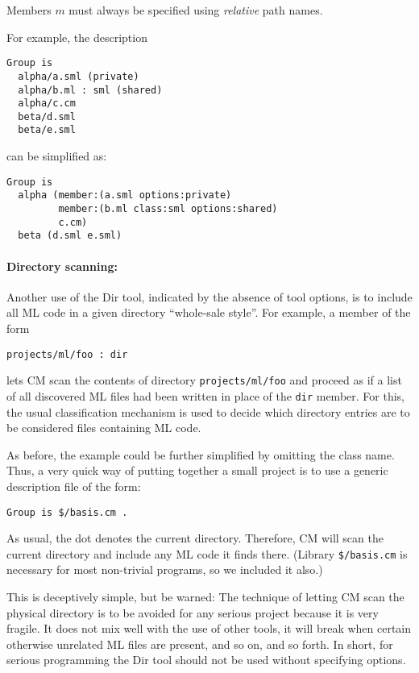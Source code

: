 Members $m$ must always be specified using {\em relative} path names.

For example, the description

\begin{lstlisting}[language=CM]
Group is
  alpha/a.sml (private)
  alpha/b.ml : sml (shared)
  alpha/c.cm
  beta/d.sml
  beta/e.sml
\end{lstlisting}%

can be simplified as:

\begin{lstlisting}[language=CM]
Group is
  alpha (member:(a.sml options:private)
         member:(b.ml class:sml options:shared)
         c.cm)
  beta (d.sml e.sml)
\end{lstlisting}%

\paragraph{Directory scanning:}
Another use of the Dir tool, indicated by the absence of tool options,
is to include all ML code in a given directory ``whole-sale style''.
For example, a member of the form

\begin{lstlisting}[language=CM]
  projects/ml/foo : dir
\end{lstlisting}%

lets CM scan the contents of directory {\tt projects/ml/foo} and
proceed as if a list of all discovered ML files had been written
in place of the {\tt dir} member.  For this, the usual classification
mechanism is used to decide which directory entries are to be
considered files containing ML code.

As before, the example could be further simplified by omitting the
class name.  Thus, a very quick way of putting together a small
project is to use a generic description file of the form:

\begin{lstlisting}[language=CM]
Group is $/basis.cm .
\end{lstlisting}%

As usual, the dot denotes the current directory.  Therefore, CM will
scan the current directory and include any ML code it finds there.
(Library {\tt \$/basis.cm} is necessary for most non-trivial programs,
so we included it also.)

This is deceptively simple, but be warned: The technique of letting CM
scan the physical directory is to be avoided for any serious project
because it is very fragile.  It does not mix well with the use of
other tools, it will break when certain otherwise unrelated ML files
are present, and so on, and so forth. In short, for serious
programming the Dir tool should not be used without specifying
options.
